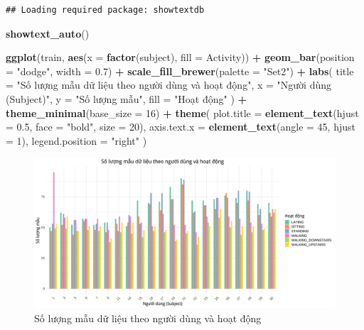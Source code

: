 \documentclass[
]{article}
\newenvironment{Shaded}{\begin{snugshade}}{\end{snugshade}}
\newcommand{\AttributeTok}[1]{\textcolor[rgb]{0.13,0.29,0.53}{#1}}
\newcommand{\DecValTok}[1]{\textcolor[rgb]{0.00,0.00,0.81}{#1}}
\newcommand{\FloatTok}[1]{\textcolor[rgb]{0.00,0.00,0.81}{#1}}
\newcommand{\FunctionTok}[1]{\textcolor[rgb]{0.13,0.29,0.53}{\textbf{#1}}}
\newcommand{\NormalTok}[1]{#1}
\newcommand{\SpecialCharTok}[1]{\textcolor[rgb]{0.81,0.36,0.00}{\textbf{#1}}}
\newcommand{\StringTok}[1]{\textcolor[rgb]{0.31,0.60,0.02}{#1}}
\begin{document}
\begin{verbatim}
## Loading required package: showtextdb
\end{verbatim}

\begin{Shaded}
\begin{Highlighting}[]
\FunctionTok{showtext\_auto}\NormalTok{()}

\FunctionTok{ggplot}\NormalTok{(train, }\FunctionTok{aes}\NormalTok{(}\AttributeTok{x =} \FunctionTok{factor}\NormalTok{(subject), }\AttributeTok{fill =}\NormalTok{ Activity)) }\SpecialCharTok{+}
  \FunctionTok{geom\_bar}\NormalTok{(}\AttributeTok{position =} \StringTok{"dodge"}\NormalTok{, }\AttributeTok{width =} \FloatTok{0.7}\NormalTok{) }\SpecialCharTok{+}
  \FunctionTok{scale\_fill\_brewer}\NormalTok{(}\AttributeTok{palette =} \StringTok{"Set2"}\NormalTok{) }\SpecialCharTok{+} 
  \FunctionTok{labs}\NormalTok{(}
    \AttributeTok{title =} \StringTok{"Số lượng mẫu dữ liệu theo người dùng và hoạt động"}\NormalTok{,}
    \AttributeTok{x =} \StringTok{"Người dùng (Subject)"}\NormalTok{,}
    \AttributeTok{y =} \StringTok{"Số lượng mẫu"}\NormalTok{,}
    \AttributeTok{fill =} \StringTok{"Hoạt động"}
\NormalTok{  ) }\SpecialCharTok{+}
  \FunctionTok{theme\_minimal}\NormalTok{(}\AttributeTok{base\_size =} \DecValTok{16}\NormalTok{) }\SpecialCharTok{+}
  \FunctionTok{theme}\NormalTok{(}
    \AttributeTok{plot.title =} \FunctionTok{element\_text}\NormalTok{(}\AttributeTok{hjust =} \FloatTok{0.5}\NormalTok{, }\AttributeTok{face =} \StringTok{"bold"}\NormalTok{, }\AttributeTok{size =} \DecValTok{20}\NormalTok{),}
    \AttributeTok{axis.text.x =} \FunctionTok{element\_text}\NormalTok{(}\AttributeTok{angle =} \DecValTok{45}\NormalTok{, }\AttributeTok{hjust =} \DecValTok{1}\NormalTok{),}
    \AttributeTok{legend.position =} \StringTok{"right"}
\NormalTok{  )}
\end{Highlighting}
\end{Shaded}

\begin{figure}
\centering
\includegraphics{report_files/figure-latex/unnamed-chunk-11-1.pdf}
\caption{Số lượng mẫu dữ liệu theo người dùng và hoạt động}
\end{figure}
\end{document}
